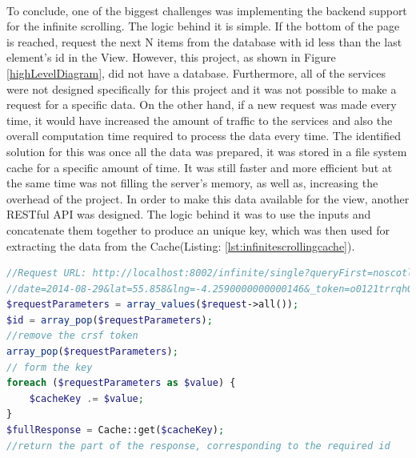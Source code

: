 \documentclass{l4proj}
\begin{document}
\paragraph{}
To conclude, one of the biggest challenges was implementing the backend support for the infinite scrolling. The logic behind it is simple. If the bottom of the page is reached, request the next N items from the database with id less than the last element's id in the View. However, this project, as shown in Figure \ref{highLevelDiagram}, did not have a database. Furthermore, all of the services were not designed specifically for this project and it was not possible to make a request for a specific data. On the other hand, if a new request was made every time, it would have increased the amount of traffic to the services and also the overall computation time required to process the data every time. The identified solution for this was once all the data was prepared, it was stored in a file system cache for a specific amount of time. It was still faster and more efficient but at the same time was not filling the server's memory, as well as, increasing the overhead of the project. In order to make this data available for the view, another RESTful API was designed. The logic behind it was to use the inputs and concatenate them together to produce an unique key, which was then used for extracting the data from the Cache(Listing: \ref{lst:infinitescrollingcache}).   

\begin{lstlisting}[caption={Using Cache for infinite scrolling},label={lst:infinitescrollingcache},language=PHP]
//Request URL: http://localhost:8002/infinite/single?queryFirst=noscotland&
//date=2014-08-29&lat=55.858&lng=-4.2590000000000146&_token=o0121trrqhGeBEv4F1fVqAcYLKinSJabgQ9GOjHQ&sectionID=03am
$requestParameters = array_values($request->all());
$id = array_pop($requestParameters);
//remove the crsf token 
array_pop($requestParameters);
// form the key
foreach ($requestParameters as $value) {
    $cacheKey .= $value;
}
$fullResponse = Cache::get($cacheKey);
//return the part of the response, corresponding to the required id 
\end{lstlisting}


\end{document}
